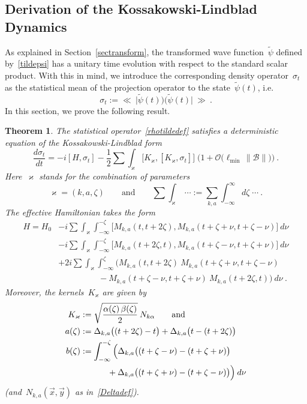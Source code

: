\documentclass[reqno,11pt]{amsart}
\numberwithin{equation}{section}
\newtheorem{Thm}[Def]{Theorem}
\newcommand{\beq}{\begin{equation}}
\newcommand{\eeq}{\end{equation}}
\newcommand{\bbra}{\mathopen{\ll}}
\newcommand{\kket}{\mathclose{\gg}}
\newcommand{\1}{\mathds{1}}
\renewcommand{\O}{{\mathscr{O}}}
\newcommand{\B}{{\mathscr{B}}}
\newcommand{\sint}{\sum  \!\!\!\!\!\!\! \int }
\begin{document}
\subsection{Derivation of the Kossakowski-Lindblad Dynamics} \label{seclindblad}
As explained in Section~\ref{sectransform}, the transformed wave function~$\tilde{\psi}$
defined by~\eqref{tildepsi} has a unitary time evolution with respect to the standard scalar product.
With this in mind, we introduce the corresponding density operator~$\sigma_t$ as
the statistical mean of the projection operator to the state~$\tilde{\psi}(t)$, i.e.\
\beq \label{rhotildedef}
\sigma_t := \bbra \:\big| \tilde{\psi}(t) \big) \big( \tilde{\psi}(t) \big| \:\kket \:.
\eeq
In this section, we prove the following result.
\begin{Thm} \label{thmlindblad}
The statistical operator~\eqref{rhotildedef} satisfies a deterministic equation
of the Kossakowski-Lindblad form
\[ \frac{d \sigma_t}{dt} = -i [H, \sigma_t] - \frac{1}{2} \sint_\varkappa 
\big[ K_\varkappa, [K_\varkappa, \sigma_t] \big] \; \Big( 1 + \O \big( \ell_{\min}\, \|\B\| \big) \Big)\:. \]
Here~$\varkappa$ stands for the combination of parameters
\beq \label{kappadef}
\varkappa = (k, a, \zeta) \qquad \text{and} \qquad
\sint_\varkappa\;\cdots := \sum_{k,a} \int_{-\infty}^\infty d\zeta \;\cdots \:.
\eeq
The effective Hamiltonian takes the form
\begin{align}
H = H_0 &- i \sint_\varkappa
\int_{-\infty}^{-\zeta} \big[ M_{k,a}(t,t+2 \zeta), M_{k,a}(t+\zeta+\nu, t+\zeta-\nu) \big] \: d\nu \label{Hn1} \\
&-i \sint_\varkappa \int_{-\infty}^{-\zeta} \big[ M_{k,a}(t+2 \zeta, t), M_{k,a}(t+\zeta-\nu, t+\zeta+\nu) \big] \: d\nu \\
&+2i \sint_\varkappa \int_{-\infty}^\zeta \Big( M_{k,a}(t, t+2 \zeta) \:M_{k,a}(t+\zeta+\nu, t+\zeta-\nu) \\
&\qquad\qquad \;\;\:
- M_{k,a}(t+\zeta-\nu, t+\zeta+\nu) \:M_{k,a}(t+2 \zeta, t) \Big)\: d\nu \:. \label{Hn4}
\end{align}
Moreover, the kernels~$K_\varkappa$ are given by
\begin{align}
K_\varkappa &:= \sqrt{\frac{\alpha(\zeta)\, \beta(\zeta)}{2}}\: N_{k \alpha} \qquad \text{and} \label{Kkappa} \\
a(\zeta) &:= \Delta_{k,a}\big( (t+2 \zeta) - t \big) + \Delta_{k,a}\big( t - (t+2 \zeta) \big) \label{adef} \\
b(\zeta) &:= \int_{-\infty}^{-\zeta} \Big( \Delta_{k,a}\big( (t+\zeta-\nu) - (t+\zeta+\nu) \big) \notag \\
&\qquad\quad\: + \Delta_{k,a}\big( (t+\zeta+\nu) - (t+\zeta-\nu) \big) \Big) \:d\nu \label{bdef} 
\end{align}
(and~$N_{k,a}(\vec{x}, \vec{y})$ as in~\eqref{Deltadef}).
\end{Thm}
\end{document}
